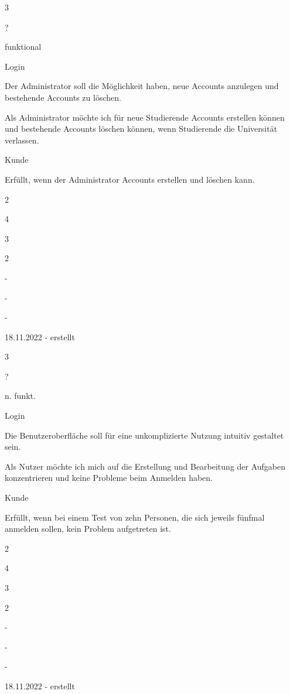 \documentclass{article}
\newenvironment{myreq}[1]{%
\setlist[description]{font=\normalfont\color{darkgray}}%
\begin{tcolorbox}[colframe=black,colback=white, sharp corners, boxrule=1pt]%
\bfseries\color{blue}%
\begin{description}#1}%
{\end{description}\end{tcolorbox}}
\newcommand{\threeinline}[3]{\begin{multicols}{3}#1 #2 #3\end{multicols}}
\newcommand{\twoinline}[2]{\begin{multicols}{2}#1 #2\end{multicols}}
\newcommand{\reqno}{\item[Requirement \#:]}
\newcommand{\reqtype}{\item[Requirement Type:]}
\newcommand{\reqevent}{\item[Event/UC:]}
\newcommand{\reqdesc}{\item[Description:]}
\newcommand{\reqrat}{\item[Rationale:]}
\newcommand{\reqorig}{\item[Originator:]}
\newcommand{\reqfit}{\item[Fit Criterion:]}
\newcommand{\reqsatis}{\item[Customer Satisfaction:]}
\newcommand{\reqdissat}{\item[Customer Dissatisfaction:]}
\newcommand{\reqdep}{\item[Dependencies:]}
\newcommand{\reqconf}{\item[Conflicts:]}
\newcommand{\reqmater}{\item[Materials:]}
\newcommand{\reqhist}{\item[History:]}
\begin{document}
\begin{myreq}
  \threeinline
    {\reqno ?}
    {\reqtype funktional}
    {\reqevent Login}
  \reqdesc Der Administrator soll die Möglichkeit haben, neue Accounts anzulegen und bestehende Accounts zu löschen.
  \reqrat Als Administrator möchte ich für neue Studierende Accounts erstellen können und bestehende Accounts löschen können, wenn Studierende die Universität verlassen.
  \reqorig Kunde 
  \reqfit Erfüllt, wenn der Administrator Accounts erstellen und löschen kann.
  \twoinline
    {\reqsatis 4}
    {\reqdissat 3}
  \twoinline
  {\reqdep -}
  {\reqconf -}
  \reqmater -
  \reqhist 18.11.2022 - erstellt
\end{myreq}

\begin{myreq}
  \threeinline
    {\reqno ?}
    {\reqtype n. funkt.}
    {\reqevent Login}
  \reqdesc Die Benutzeroberfläche soll für eine unkomplizierte Nutzung intuitiv gestaltet sein.
  \reqrat Als Nutzer möchte ich mich auf die Erstellung und Bearbeitung der Aufgaben konzentrieren und keine Probleme beim Anmelden haben.
  \reqorig Kunde 
  \reqfit Erfüllt, wenn bei einem Test von zehn Personen, die sich jeweils fünfmal anmelden sollen, kein Problem aufgetreten ist.
  \twoinline
    {\reqsatis 4}
    {\reqdissat 3}
  \twoinline
  {\reqdep -}
  {\reqconf -}
  \reqmater -
  \reqhist 18.11.2022 - erstellt
\end{myreq}
\end{document}
